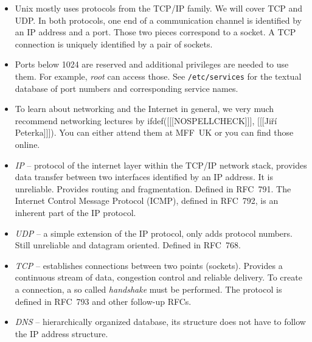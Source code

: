 \begin{itemize}
\item Unix mostly uses protocols from the TCP/IP family.  We will cover TCP and
UDP.  In both protocols, one end of a communication channel is identified by an
IP address and a port.  Those two pieces correspond to a socket.  A TCP
connection is uniquely identified by a pair of sockets.
\item Ports below 1024 are reserved and additional privileges are needed to use
them.  For example, \emph{root} can access those.  See \texttt{/etc/services}
for the textual database of port numbers and corresponding service names.
\item To learn about networking and the Internet in general, we very much
recommend networking lectures by
ifdef([[[NOSPELLCHECK]]], [[[Ji\v{r}\'{i} Peterka]]]).  You can either
attend them at MFF~UK or you can find those online.
\item \emph{IP} -- protocol of the internet layer within the TCP/IP network
stack, provides data transfer between two interfaces identified by an IP
address.  It is unreliable.  Provides routing and fragmentation.  Defined in
RFC~791.  The Internet Control Message Protocol (ICMP), defined in RFC~792, is
an inherent part of the IP protocol.
\item \emph{UDP} -- a simple extension of the IP protocol, only adds protocol
numbers.  Still unreliable and datagram oriented.  Defined in RFC~768.
\item \emph{TCP} -- establishes connections between two points (sockets).
Provides a continuous stream of data, congestion control and reliable
delivery.  To create a connection, a so called \emph{handshake} must be
performed.  The protocol is defined in RFC~793 and other follow-up RFCs.
\item \emph{DNS} -- hierarchically organized database, its structure does not
have to follow the IP address structure.
\end{itemize}


\begin{slide}

\end{slide}

